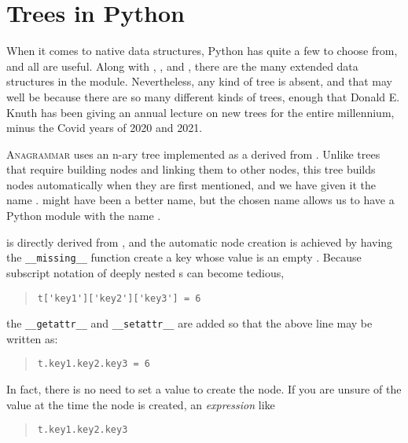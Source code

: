 \documentclass[letterpaper, 11pt]{article}
\providecommand{\anagrammar}{A\textsc{nagrammar}\xspace}
\begin{document}
\section{Trees in Python}
\label{sec:trees}

When it comes to native data structures, Python has quite a few to choose
from, and all are useful. Along with , , and ,
there are the many extended data structures in the  module. 
Nevertheless, any kind of tree is absent, and that may well be because there are so many 
different kinds of trees, enough that Donald E. Knuth has been giving an
annual lecture on new trees for the entire millennium, minus the Covid years of
2020 and 2021.

\anagrammar uses an n-ary tree implemented as a  derived from .
Unlike trees that require building nodes and linking them to other nodes, this tree
builds nodes automatically when they are first mentioned, and we have given
it the name \texttrademark.  might have been a 
better name, but the chosen name allows us to have a Python module with the
name .

 is directly derived from , and the
automatic node creation is achieved by having the \verb|__missing__|
function create a key whose value is an empty .
Because subscript notation of deeply nested s can become
tedious,

\begin{quote}
\begin{verbatim}
t['key1']['key2']['key3'] = 6
\end{verbatim}
\end{quote}

the \verb|__getattr__| and \verb|__setattr__| are added so that the
above line may be written as:

\begin{quote}
\begin{verbatim}
t.key1.key2.key3 = 6
\end{verbatim}
\end{quote}

In fact, there is no need to set a value to create the node. If you
are unsure of the value at the time the node is created, an
\emph{expression} like

\begin{quote}
\begin{verbatim}
t.key1.key2.key3
\end{verbatim}
\end{quote}
\end{document}
